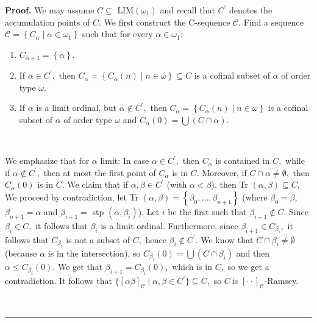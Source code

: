 \documentclass{article}
\newenvironment{proof}[1][Proof]{\noindent\textbf{#1.} }{\ \rule{0.5em}{0.5em}}
\begin{document}
\begin{proof}
We may assume $C\subseteq$ \textsf{LIM}$\left(  \omega_{1}\right)  $ and
recall that $C^{\prime}$ denotes the accumulation points of $C.$ We first
construct the \textsf{C}-sequence $\mathcal{C}.$ Find a sequence
$\mathcal{C}=\left\{  C_{\alpha}\mid\alpha\in\omega_{1}\right\}  $ such that
for every $\alpha\in\omega_{1}:$

\begin{enumerate}
\item $C_{\alpha+1}=\left\{  \alpha\right\}  .$

\item If $\alpha\in C^{\prime},$ then $C_{\alpha}=\left\{  C_{\alpha}\left(
n\right)  \mid n\in\omega\right\}  \subseteq C$ is a cofinal subset of
$\alpha$ of order type $\omega$.

\item If $\alpha$ is a limit ordinal, but $\alpha\notin C^{\prime},$ then
$C_{\alpha}=\left\{  C_{\alpha}\left(  n\right)  \mid n\in\omega\right\}  $ is
a cofinal subset of $\alpha$ of order type $\omega$ and $C_{\alpha}\left(
0\right)  =\bigcup\left(  C\cap\alpha\right)  .$
\end{enumerate}

\qquad\ \ 

We emphasize that for $\alpha$ limit: In case $\alpha\in C^{\prime},$ then
$C_{\alpha}$ is contained in $C,$ while if $\alpha\notin C^{\prime},$ then at
most the first point of $C_{\alpha}$ is in $C$. Moreover, if $C\cap\alpha
\neq\emptyset,$ then $C_{\alpha}\left(  0\right)  $ is in $C.$ We claim that
if $\alpha,\beta\in C^{\prime}$ (with $\alpha<\beta$), then \textsf{Tr}%
$(\alpha,\beta)\subseteq C.$ We proceed by contradiction, let \textsf{Tr}%
$(\alpha,\beta)=\left\{  \beta_{0},...,\beta_{n+1}\right\}  $ (where
$\beta_{0}=\beta,$ $\beta_{n+1}=\alpha$ and $\beta_{i+1}=$ \textsf{stp}%
$\left(  \alpha,\beta_{i}\right)  $). Let $i$ be the first such that
$\beta_{i+1}\notin C$. Since $\beta_{i}\in C,$ it follows that $\beta_{i}$ is
a limit ordinal. Furthermore, since $\beta_{i+1}\in C_{\beta_{i}},$ it follows
that $C_{\beta_{i}}$ is not a subset of $C,$ hence $\beta_{i}\notin C^{\prime
}.$ We know that $C\cap\beta_{i}\neq\emptyset$ (because $\alpha$ is in the
intersection), so $C_{\beta_{i}}\left(  0\right)  =\bigcup\left(  C\cap
\beta_{i}\right)  $ and then $\alpha\leq C_{\beta_{i}}\left(  0\right)  .$ We
get that $\beta_{i+1}=C_{\beta_{i}}\left(  0\right)  ,$ which is in $C,$ so we
get a contradiction. It follows that $\{\left[  \alpha\beta\right]
_{\mathcal{C}}\mid\alpha,\beta\in C^{\prime}\}\subseteq C,$ so $C\ $is
$[\cdot\cdot]_{\mathcal{C}}$\emph{-}Ramsey.


\end{proof}
\end{document}
